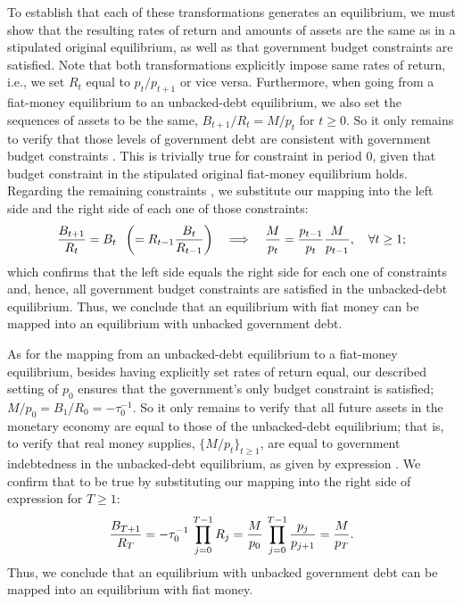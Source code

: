 To establish that each of these  transformations generates an   equilibrium, we must show that the resulting rates of return and amounts of assets are the same as in a stipulated original equilibrium, as well 
as that government budget constraints are satisfied. Note that 
both transformations  explicitly impose same rates of return, i.e., we
set $R_t$ equal to $p_t/p_{t+1}$ or vice versa. Furthermore, 
when going from a fiat-money equilibrium 
to an unbacked-debt equilibrium, we also set the sequences
of assets to be the same, $B_{t+1}/R_t=M/p_t$ for $t\geq 0$. So
it only remains to verify that those levels of government debt
are consistent with government budget constraints . 
This is trivially true for constraint  in 
period $0$, given that budget constraint  in the 
stipulated original fiat-money equilibrium holds. Regarding the 
remaining constraints , we substitute our 
mapping into the left side and the right side of each one of 
those constraints:
$${B_{t+1} \over R_t} = B_t \;\; 
\left(= R_{t-1} {B_t \over R_{t-1}} \right)
\quad \Longrightarrow \quad     
{M \over p_t} = {p_{t-1} \over p_t} {M \over p_{t-1}} ,
\quad \forall t \geq 1;
$$
which confirms that the left side equals the right side for
each one of constraints  and, hence, all 
government budget constraints are satisfied in the unbacked-debt
equilibrium. Thus, we conclude that an equilibrium with
fiat money can be mapped into an equilibrium with unbacked 
government debt. 

As for the mapping from an unbacked-debt 
equilibrium to a fiat-money equilibrium, besides having
explicitly set rates of return equal, our described 
setting of $p_0$ ensures that the government's only
budget constraint  is satisfied;
$M/p_0=B_1/R_0 = -\tau^{-1}_0$. So it only
remains to verify that all future assets in the
monetary economy are equal to those of the
unbacked-debt equilibrium; that is, to verify that
real money supplies, $\{M/p_t\}_{t\geq 1}$, are equal 
to government indebtedness in the unbacked-debt 
equilibrium, as given by expression . 
We confirm that to be true 
by substituting our mapping into the right side of 
expression  for $T \geq 1$:
$$ {B_{T+1} \over R_{T} } = -\tau^{-1}_0 \, \prod_{j=0}^{T-1} R_j 
= {M \over p_0} \, \prod_{j=0}^{T-1} {p_j \over p_{j+1} }
= {M \over p_T }.
$$
Thus, we conclude that an equilibrium with unbacked 
government debt can be mapped into an equilibrium
with fiat money. 

